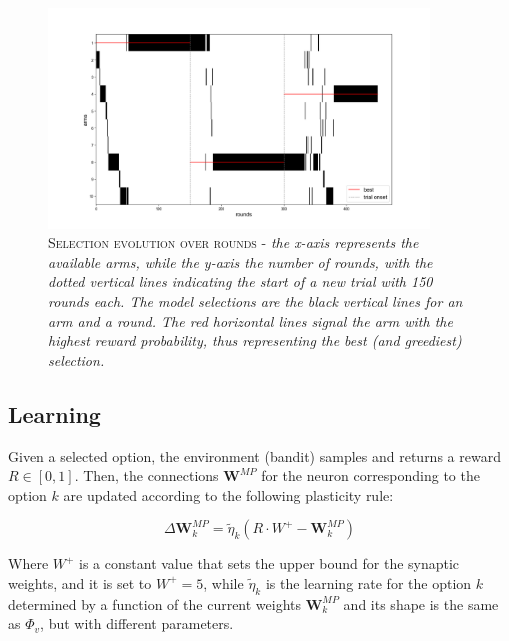 \begin{figure}[h]
    \centering
    \includegraphics[width=0.9\textwidth]{figures/selections_1.png}
    \caption{\textsc{Selection evolution over rounds} - \textit{the x-axis represents the available arms, while the y-axis the number of rounds, with the dotted vertical lines indicating the start of a new trial with 150 rounds each. The model selections are the black vertical lines for an arm and a
    round. The red horizontal lines signal the arm with the highest reward probability, thus representing the best (and greediest) selection.}}
    \label{fig:sel1}
\end{figure}


\subsection{Learning}
Given a selected option, the environment (bandit) samples and returns a reward $R\in [0, 1]$.
Then, the connections $\textbf{W}^{MP}$ for the neuron corresponding to the option $k$ are updated according to the following plasticity rule:

\begin{equation}
    \Delta \textbf{W}^{MP}_{k} = \tilde{\eta}_{k} \left(R\cdot W^{+}- \textbf{W}^{MP}_{k}\right)
\end{equation}

\noindent
Where $W^{+}$ is a constant value that sets the upper bound for the synaptic weights, and it is set to $W^{+} = 5$, while $\tilde{\eta}_{k}$ is the learning rate for the option $k$ determined by a function of the current weights $\textbf{W}^{MP}_{k}$ and its shape is the same as $\Phi_{v}$, but with
different parameters.



